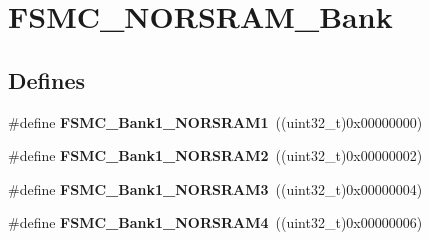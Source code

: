 \hypertarget{group__FSMC__NORSRAM__Bank}{
\section{FSMC\_\-NORSRAM\_\-Bank}
\label{group__FSMC__NORSRAM__Bank}
}
\subsection*{Defines}
\begin{DoxyCompactItemize}
\item 
\hypertarget{group__FSMC__NORSRAM__Bank_ga514a05828041fa1a13d464c9e4a0a4a9}{
\#define {\bfseries FSMC\_\-Bank1\_\-NORSRAM1}~((uint32\_\-t)0x00000000)}
\label{group__FSMC__NORSRAM__Bank_ga514a05828041fa1a13d464c9e4a0a4a9}

\item 
\hypertarget{group__FSMC__NORSRAM__Bank_gaef52862c652370b9a658478d275dd956}{
\#define {\bfseries FSMC\_\-Bank1\_\-NORSRAM2}~((uint32\_\-t)0x00000002)}
\label{group__FSMC__NORSRAM__Bank_gaef52862c652370b9a658478d275dd956}

\item 
\hypertarget{group__FSMC__NORSRAM__Bank_ga151b02506a318ac77382b52f3b5e16f4}{
\#define {\bfseries FSMC\_\-Bank1\_\-NORSRAM3}~((uint32\_\-t)0x00000004)}
\label{group__FSMC__NORSRAM__Bank_ga151b02506a318ac77382b52f3b5e16f4}

\item 
\hypertarget{group__FSMC__NORSRAM__Bank_ga1083572834aa084d21e6698c280f8f74}{
\#define {\bfseries FSMC\_\-Bank1\_\-NORSRAM4}~((uint32\_\-t)0x00000006)}
\label{group__FSMC__NORSRAM__Bank_ga1083572834aa084d21e6698c280f8f74}

\end{DoxyCompactItemize}
